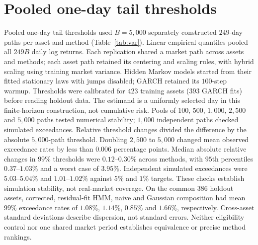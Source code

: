 \begin{table}[H]
  \centering
  \caption{\textbf{Paired control for residual centering on common
    training assets.} Native and centered results use the same
    $393$ assets and $100$ paths per asset. Centered paths have zero
    residual mean over $2{,}766$ observations. Kolmogorov--Smirnov (KS)
    and Anderson--Darling (AD) columns give non-rejection percentages
    at $\alpha=0.05$; higher values indicate closer empirical fit.
    $W_1$ is median Wasserstein-1 distance, and $|\hat\alpha-\alpha|$
    is median absolute ordinary least squares (OLS) intercept error, both in
    $\mathrm{yr}^{-1}$; lower values indicate closer agreement.
    Naive and hybrid already center each residual path.
    JumpHMM denotes the hidden Markov generator, with jumps disabled;
    SIM denotes the single-index model, and GARCH denotes generalized
    autoregressive conditional heteroskedasticity.}
  \label{tab:centering_control}
  \footnotesize
  \setlength{\tabcolsep}{3pt}
  
\end{table}

\clearpage
\section{Pooled one-day tail thresholds}
\label{sec:supp-var-ensemble}

Pooled one-day tail thresholds used $B=5{,}000$ separately constructed $249$-day paths per asset and method (Table~\ref{tab:var}). Linear empirical quantiles pooled all $249B$ daily log returns. Each replication shared a market path across assets and methods; each asset path retained its centering and scaling rules, with hybrid scaling using training market variance. Hidden Markov models started from their fitted stationary laws with jumps disabled; GARCH retained its $100$-step warmup. Thresholds were calibrated for $423$ training assets ($393$ GARCH fits) before reading holdout data. The estimand is a uniformly selected day in this finite-horizon construction, not cumulative risk.
Pools of $100$, $500$, $1{,}000$, $2{,}500$ and $5{,}000$ paths tested numerical stability; $1{,}000$ independent paths checked simulated exceedances. Relative threshold changes divided the difference by the absolute $5{,}000$-path threshold. Doubling $2{,}500$ to $5{,}000$ changed mean observed exceedance rates by less than $0.006$ percentage points. Median absolute relative changes in $99\%$ thresholds were $0.12$--$0.30\%$ across methods, with $95$th percentiles $0.37$--$1.03\%$ and a worst case of $3.95\%$. Independent simulated exceedances were $5.03$--$5.04\%$ and $1.01$--$1.02\%$ against $5\%$ and $1\%$ targets. These checks establish simulation stability, not real-market coverage.
On the common $386$ holdout assets, corrected, residual-fit HMM, naive and Gaussian composition had mean $99\%$ exceedance rates of $1.08\%$, $1.14\%$, $0.85\%$ and $1.66\%$, respectively. Cross-asset standard deviations describe dispersion, not standard errors. Neither eligibility control nor one shared market period establishes equivalence or precise method rankings.

